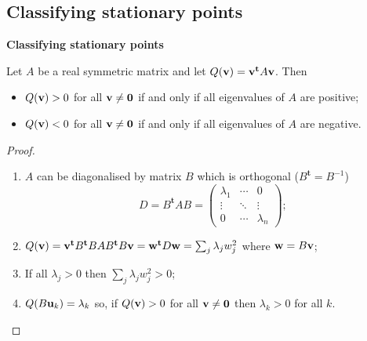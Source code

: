 \subsection{Classifying stationary points}



\textbf{Classifying stationary points}


\begin{theorem}
    Let \(A\) be a real symmetric matrix and let
    \(Q(\mathbf{v}) =  \mathbf{v}^{\mathbf{t}} A  \mathbf{v}  \).
    Then
    \begin{itemize}
        \item \(Q(\mathbf{v}) > 0\) for all \(\mathbf{v} \neq \mathbf{0}\) if and only if all eigenvalues of \(A\) are positive;
        \item \(Q(\mathbf{v}) < 0\) for all \(\mathbf{v} \neq \mathbf{0}\) if and only if all eigenvalues of \(A\) are negative.
    \end{itemize}
\end{theorem}

\begin{proof}
    \begin{enumerate}
        \item \(A\) can be diagonalised by  matrix \(B\)  which is orthogonal (\(B^{\mathbf{t}}=B^{-1}\))
              \[
                  D = B^{\mathbf{t}} A B =
                  \begin{pmatrix}
                      \lambda_1 & \cdots & 0         \\
                      \vdots    & \ddots & \vdots    \\
                      0         & \cdots & \lambda_n
                  \end{pmatrix};
              \]
              \vspace{-1em}
        \item \(Q(\mathbf{v}) = \mathbf{v}^{\mathbf{t}} B^{\mathbf{t}} B A B^{\mathbf{t}} B \mathbf{v}  = \mathbf{w}^{\mathbf{t}} D \mathbf{w} = \sum_{j} \lambda_j w_j^2  \) where \(\mathbf{w} = B \mathbf{v}\);
        \item If all \(\lambda_j >0\) then \( \sum_{j} \lambda_j w_j^2  >0\);
        \item \(Q(B \mathbf{u}_k ) = \lambda_k\) so, if \(Q(\mathbf{v}) > 0\) for all \(\mathbf{v} \neq \mathbf{0}\) then \(\lambda_k>0\) for all \(k\). \qedhere
    \end{enumerate}
\end{proof}





